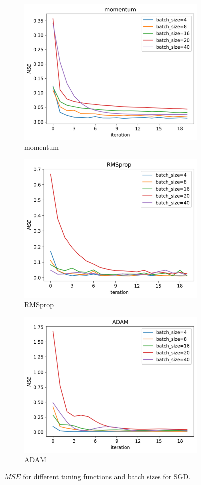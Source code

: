 \documentclass[11pt]{article}
\begin{document}
\begin{figure}[H]
\begin{subfigure}{.5\textwidth}
    \includegraphics[width=.9\textwidth]{../figures/SGD_batch_size_momentum.png}
    \caption{momentum}
    \label{fig:}
  \end{subfigure}
  \begin{subfigure}{.5\textwidth}
    \centering
    \includegraphics[width=.9\textwidth]{../figures/SGD_batch_size_RMSprop.png}
    \caption{RMSprop}
    \label{fig:}
  \end{subfigure}
  \begin{subfigure}{.9\textwidth}
    \centering
    \includegraphics[width=.5\textwidth]{../figures/SGD_batch_size_ADAM.png}
    \caption{ADAM}
    \label{fig:}
  \end{subfigure}
  \caption{$MSE$ for different tuning functions and batch sizes for SGD.}
  \label{fig:compare_batch_size}
\end{figure}
\end{document}
